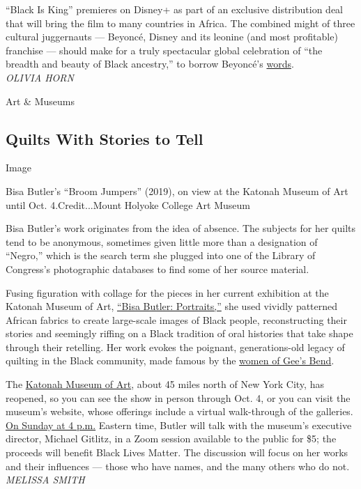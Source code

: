 ``Black Is King'' premieres on Disney+ as part of an exclusive
distribution deal that will bring the film to many countries in Africa.
The combined might of three cultural juggernauts --- Beyoncé, Disney and
its leonine (and most profitable) franchise --- should make for a truly
spectacular global celebration of ``the breadth and beauty of Black
ancestry,'' to borrow Beyoncé's
\href{https://www.instagram.com/p/CCAMxfrHjAL/}{words}.\\
\emph{OLIVIA HORN}

Art \& Museums

\hypertarget{quilts-with-stories-to-tell}{%
\subsection{Quilts With Stories to
Tell}\label{quilts-with-stories-to-tell}}

Image

Bisa Butler's ``Broom Jumpers'' (2019), on view at the Katonah Museum of
Art until Oct. 4.Credit...Mount Holyoke College Art Museum

Bisa Butler's work originates from the idea of absence. The subjects for
her quilts tend to be anonymous, sometimes given little more than a
designation of ``Negro,'' which is the search term she plugged into one
of the Library of Congress's photographic databases to find some of her
source material.

Fusing figuration with collage for the pieces in her current exhibition
at the Katonah Museum of Art,
\href{http://www.katonahmuseum.org/exhibitions/}{``Bisa Butler:
Portraits,''} she used vividly patterned African fabrics to create
large-scale images of Black people, reconstructing their stories and
seemingly riffing on a Black tradition of oral histories that take shape
through their retelling. Her work evokes the poignant, generations-old
legacy of quilting in the Black community, made famous by the
\href{https://www.soulsgrowndeep.org/gees-bend-quiltmakers}{women of
Gee's Bend}.

The \href{http://www.katonahmuseum.org/}{Katonah Museum of Art}, about
45 miles north of New York City, has reopened, so you can see the show
in person through Oct. 4, or you can visit the museum's website, whose
offerings include a virtual walk-through of the galleries.
\href{http://www.katonahmuseum.org/programs-and-events/BisaButler-Virtual-BisaButler-LiveInConversation/}{On
Sunday at 4 p.m.} Eastern time, Butler will talk with the museum's
executive director, Michael Gitlitz, in a Zoom session available to the
public for \$5; the proceeds will benefit Black Lives Matter. The
discussion will focus on her works and their influences --- those who
have names, and the many others who do not.\\
\emph{MELISSA SMITH}

